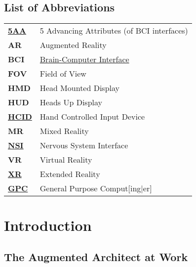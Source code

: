 \documentclass[logo,bsc,singlespacing,parskip]{infthesis}
\begin{document}
\begin{preliminary}
\iffalse %

\part{List of Abbreviations}
\label{sec:orge7db0f7}
\fi
\chapter*{List of Abbreviations}
\label{sec:orgf93255d}
\begin{center}
\begin{tabular}{ll}
\textbf{\hyperref[org2644eb5]{5AA}} & 5 Advancing Attributes (of BCI interfaces)\\
\textbf{AR} & Augmented Reality\\
\textbf{BCI} & \hyperref[org75a7ab5]{Brain-Computer Interface}\\
\textbf{FOV} & Field of View\\
\textbf{HMD} & Head Mounted Display\\
\textbf{HUD} & Heads Up Display\\
\textbf{\hyperref[org0c83164]{HCID}} & Hand Controlled Input Device\\
\textbf{MR} & Mixed Reality\\
\textbf{\hyperref[orgf403bf3]{NSI}} & Nervous System Interface\\
\textbf{VR} & Virtual Reality\\
\textbf{\hyperref[org39cbd51]{XR}} & Extended Reality\\
\textbf{\hyperref[org6ef4753]{GPC}} & General Purpose Comput[ing\(\vert{}\)er]\\
\end{tabular}

\end{center}

\setcounter{tocdepth}{1}
\tableofcontents
{}
\listoffigures
\listoftables
\end{preliminary}


\part*{Introduction}
\label{sec:org5455afd}
\chapter*{The Augmented Architect at Work}
\label{sec:org88a012c}
\end{document}
